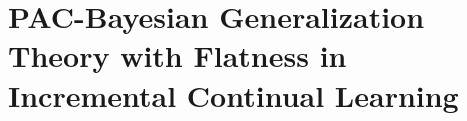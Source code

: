 \documentclass[letterpaper]{article} %
\newtheorem{theorem}{Theorem}
\begin{document}









\section{PAC-Bayesian Generalization Theory with Flatness in Incremental Continual Learning}
\end{document}
